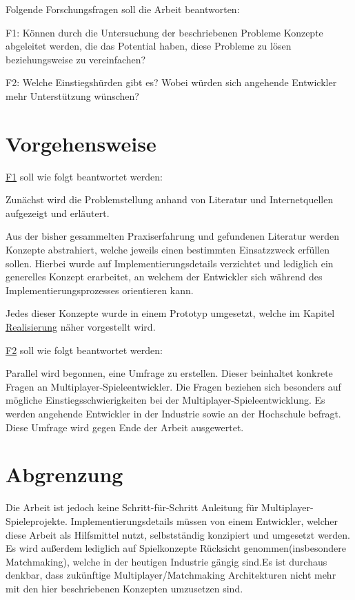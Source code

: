 Folgende Forschungsfragen soll die Arbeit beantworten:

\label{f1}F1: Können durch die Untersuchung der beschriebenen Probleme Konzepte abgeleitet werden, die das Potential haben, diese Probleme zu lösen beziehungsweise zu vereinfachen?

\label{f2}F2: Welche Einstiegshürden gibt es? Wobei würden sich angehende Entwickler mehr Unterstützung wünschen? 


\section{Vorgehensweise}

\hyperref[f1]{F1} soll wie folgt beantwortet werden:

Zunächst wird die Problemstellung anhand von Literatur und Internetquellen aufgezeigt und erläutert. 

Aus der bisher gesammelten Praxiserfahrung und gefundenen Literatur werden Konzepte abstrahiert, welche jeweils einen bestimmten Einsatzzweck erfüllen sollen. Hierbei wurde auf Implementierungsdetails verzichtet und lediglich ein generelles Konzept erarbeitet, an welchem der Entwickler sich während des Implementierungsprozesses orientieren kann.

Jedes dieser Konzepte wurde in einem Prototyp umgesetzt, welche im Kapitel \hyperref[sec:realisierung]{Realisierung} näher vorgestellt wird.

\hyperref[f2]{F2} soll wie folgt beantwortet werden:

Parallel wird begonnen, eine Umfrage zu erstellen. Dieser beinhaltet konkrete Fragen an Multiplayer-Spieleentwickler. Die Fragen beziehen sich besonders auf mögliche Einstiegsschwierigkeiten bei der Multiplayer-Spieleentwicklung. Es werden angehende Entwickler in der Industrie sowie an der Hochschule befragt. Diese Umfrage wird gegen Ende der Arbeit ausgewertet. 

\section{Abgrenzung}

Die Arbeit ist jedoch keine Schritt-für-Schritt Anleitung für Multiplayer-Spieleprojekte. Implementierungsdetails müssen von einem Entwickler, welcher diese Arbeit als Hilfsmittel nutzt, selbstständig konzipiert und umgesetzt werden. Es wird außerdem lediglich auf Spielkonzepte Rücksicht genommen(insbesondere Matchmaking), welche in der heutigen Industrie gängig sind\cite{Wikipediacontributors.}.Es ist durchaus denkbar, dass zukünftige Multiplayer/Matchmaking Architekturen nicht mehr mit den hier beschriebenen Konzepten umzusetzen sind.

